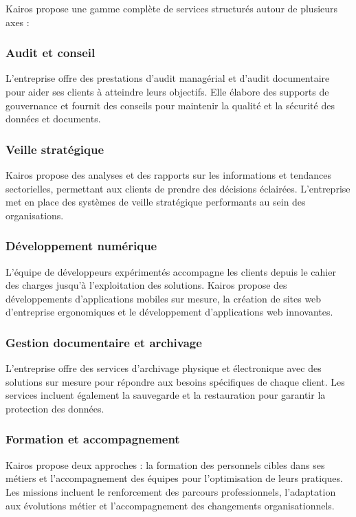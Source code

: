     Kairos propose une gamme complète de services structurés autour de plusieurs axes :
    
    \subsubsection{Audit et conseil}
    L'entreprise offre des prestations d'audit managérial et d'audit documentaire pour aider ses clients à atteindre leurs objectifs. Elle élabore des supports de gouvernance et fournit des conseils pour maintenir la qualité et la sécurité des données et documents.
    
    \subsubsection{Veille stratégique}
    Kairos propose des analyses et des rapports sur les informations et tendances sectorielles, permettant aux clients de prendre des décisions éclairées. L'entreprise met en place des systèmes de veille stratégique performants au sein des organisations.
    
    \subsubsection{Développement numérique}
    L'équipe de développeurs expérimentés accompagne les clients depuis le cahier des charges jusqu'à l'exploitation des solutions. Kairos propose des développements d'applications mobiles sur mesure, la création de sites web d'entreprise ergonomiques et le développement d'applications web innovantes.
    
    \subsubsection{Gestion documentaire et archivage}
    L'entreprise offre des services d'archivage physique et électronique avec des solutions sur mesure pour répondre aux besoins spécifiques de chaque client. Les services incluent également la sauvegarde et la restauration pour garantir la protection des données.
    
    \subsubsection{Formation et accompagnement}
    Kairos propose deux approches : la formation des personnels cibles dans ses métiers et l'accompagnement des équipes pour l'optimisation de leurs pratiques. Les missions incluent le renforcement des parcours professionnels, l'adaptation aux évolutions métier et l'accompagnement des changements organisationnels.
    
